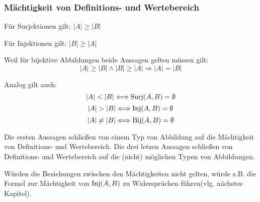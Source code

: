 \begin{figure}
\hfill
{}\hfill
{}\hfill
{}
\end{figure}

\subsubsection{Mächtigkeit von Definitions- und Wertebereich}

Für Surjektionen gilt: $|A| \geq |B|$

Für Injektionen gilt: $|B| \geq |A|$

Weil für bijektive Abbildungen beide Aussagen gelten müssen gilt:
$$|A| \geq |B| \wedge |B| \geq |A| \Rightarrow |A| = |B| $$


Analog gilt auch:
$$ |A|<|B| \Longleftrightarrow \Surj(A,B) = \emptyset $$
$$ |A|>|B| \Longleftrightarrow \Inj(A,B) = \emptyset $$
$$ |A| \neq |B| \Longleftrightarrow \text{Bij}(A,B) = \emptyset $$

Die ersten Aussagen schließen von einem Typ von Abbildung auf die Mächtigkeit von Definitions- und Wertebereich.
Die drei letzen Aussagen schließen von Definitions- und Wertebereich auf die (nicht) möglichen Typen von Abbildungen.

Würden die Beziehungen zwischen den Mächtigkeiten nicht gelten, würde z.B. die
Formel zur Mächtigkeit von $\text{Inj}(A,B)$ zu Widersprüchen führen(vlg. nächstes
Kapitel).
